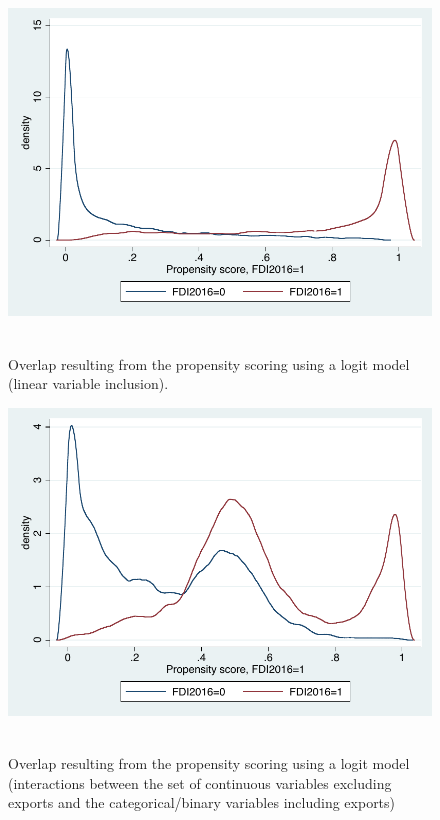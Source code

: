 \begin{figure}
	\centering
	\includegraphics[scale=0.6]{figures_and_tables/3_overlap_linearlogit1o1.pdf}\
	\caption{Overlap resulting from the propensity scoring using a logit model (linear variable inclusion).}
	\label{ol_linlog1}
\end{figure}

\begin{figure}
	\centering
	\includegraphics[scale=0.6]{figures_and_tables/3_overlap_intcatlogit1o1.pdf}\
	\caption{Overlap resulting from the propensity scoring using a logit model (interactions between the set of continuous variables excluding exports and the categorical/binary variables including exports)}
	\label{ol_intcatlog1}
\end{figure}

